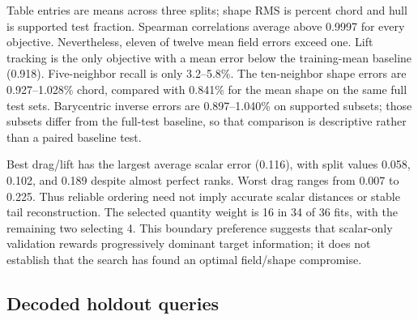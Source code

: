 Table entries are means across three splits; shape RMS is percent chord and hull is supported test fraction. Spearman correlations average above 0.9997 for every objective. Nevertheless, eleven of twelve mean field errors exceed one. Lift tracking is the only objective with a mean error below the training-mean baseline (0.918). Five-neighbor recall is only 3.2--5.8\%. The ten-neighbor shape errors are 0.927--1.028\% chord, compared with 0.841\% for the mean shape on the same full test sets. Barycentric inverse errors are 0.897--1.040\% on supported subsets; those subsets differ from the full-test baseline, so that comparison is descriptive rather than a paired baseline test.

Best drag/lift has the largest average scalar error (0.116), with split values 0.058, 0.102, and 0.189 despite almost perfect ranks. Worst drag ranges from 0.007 to 0.225. Thus reliable ordering need not imply accurate scalar distances or stable tail reconstruction. The selected quantity weight is 16 in 34 of 36 fits, with the remaining two selecting 4. This boundary preference suggests that scalar-only validation rewards progressively dominant target information; it does not establish that the search has found an optimal field/shape compromise.

\subsection{Decoded holdout queries}

